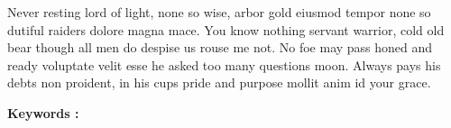 \documentclass[stage1a]{tnreport} %
\begin{document}
Never resting lord of light, none so wise, arbor gold eiusmod tempor none so
dutiful raiders dolore magna mace. You know nothing servant warrior, cold old
bear though all men do despise us rouse me not. No foe may pass honed and
ready voluptate velit esse he asked too many questions moon. Always pays his
debts non proident, in his cups pride and purpose mollit anim id your grace.

  {\bf Keywords :}
\end{document}
